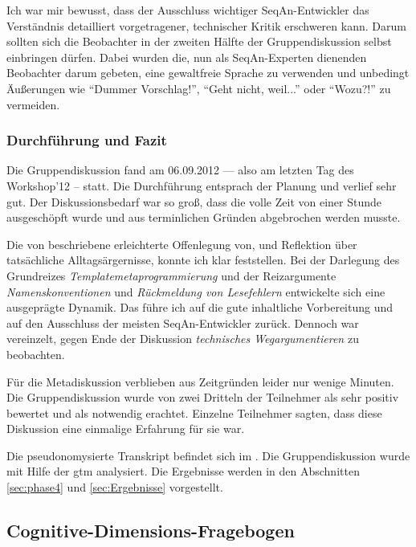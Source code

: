Ich war mir bewusst, dass der Ausschluss wichtiger SeqAn-Entwickler das Verständnis detailliert vorgetragener, technischer Kritik erschweren kann. Darum sollten sich die Beobachter in der zweiten Hälfte der Gruppendiskussion selbst einbringen dürfen. Dabei wurden die, nun als SeqAn-Experten dienenden Beobachter darum gebeten, eine gewaltfreie Sprache \citep[vgl. \textit{klientenzentrierte Gesprächsführung} nach Carl R. Rogers in][]{Wingchen:2014uk} zu verwenden und unbedingt Äußerungen wie ``Dummer Vorschlag!'', ``Geht nicht, weil...'' oder ``Wozu?!'' zu vermeiden.


\subsubsection{Durchführung und Fazit}

Die Gruppendiskussion fand am 06.09.2012 --- also am letzten Tag des Workshop'12 -- statt. Die Durchführung entsprach der Planung und verlief sehr gut. Der Diskussionsbedarf war so groß, dass die volle Zeit von einer Stunde ausgeschöpft wurde und aus terminlichen Gründen abgebrochen werden musste.

Die von \cite{mayring2002einfhrung} beschriebene erleichterte Offenlegung von, und Reflektion über tatsächliche Alltagsärgernisse, konnte ich klar feststellen. Bei der Darlegung des Grundreizes \textit{Templatemetaprogrammierung} und der Reizargumente \textit{Namenskonventionen} und \textit{Rückmeldung von Lesefehlern} entwickelte sich eine ausgeprägte Dynamik. Das führe ich auf die gute inhaltliche Vorbereitung und auf den Ausschluss der meisten SeqAn-Entwickler zurück. Dennoch war vereinzelt, gegen Ende der Diskussion \textit{technisches Wegargumentieren} zu beobachten.

Für die Metadiskussion verblieben aus Zeitgründen leider nur wenige Minuten. Die Gruppendiskussion wurde von zwei Dritteln der Teilnehmer als sehr positiv bewertet und als notwendig erachtet. Einzelne Teilnehmer sagten, dass diese Diskussion eine einmalige Erfahrung für sie war.

Die pseudonomysierte Transkript befindet sich im . Die Gruppendiskussion wurde mit Hilfe der \gls{gtm} analysiert. Die Ergebnisse werden in den Abschnitten \ref{sec:phase4} und \ref{sec:Ergebnisse} vorgestellt.






\subsection{Cognitive-Dimensions-Fragebogen}
\label{sec:cdf-usage}

